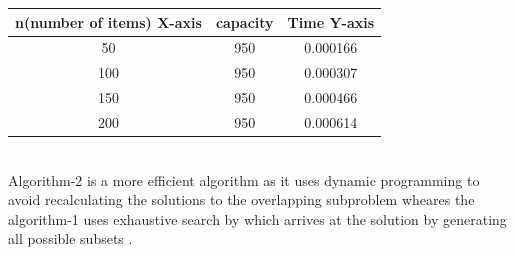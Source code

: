 \documentclass[twocolumn]{article}
\begin{document}
\begin{center}
	\begin{tabular}{ |c | c | c | }
	\hline
	
n(number of items)
X-axis
&
capacity&
Time
Y-axis




 \\
	 \hline


50&
950&
0.000166



\\
	\hline



100&
950&
0.000307



\\
\hline


150&
950&
0.000466


\\
\hline


200&
950&
0.000614



\\
\hline
	\end{tabular}
\end{center}
\\
Algorithm-2 is a more efficient algorithm as it uses dynamic programming to avoid recalculating the solutions to the overlapping subproblem wheares  the algorithm-1 uses exhaustive search by which arrives at the solution by generating all possible subsets .
\end{document}
